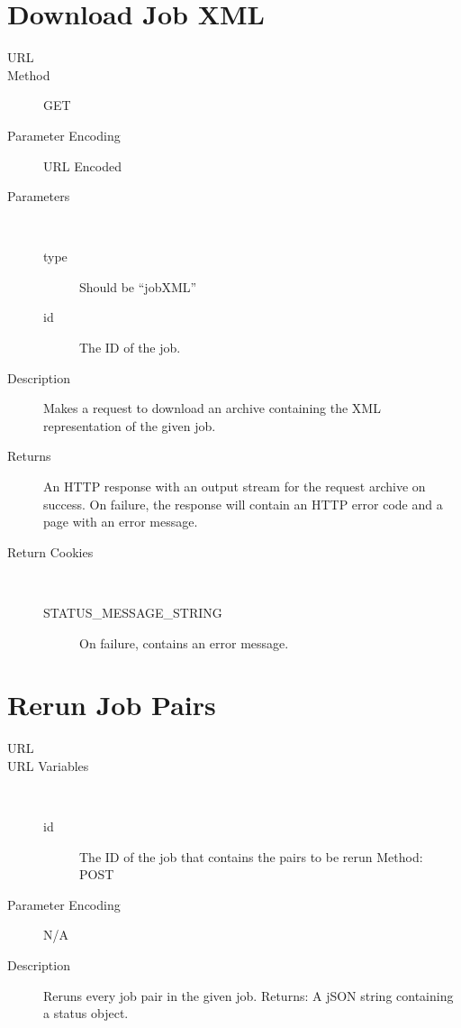 \section{Download Job XML}
\begin{description}
\item [URL] 
\item [Method] GET
\item [Parameter Encoding] URL Encoded
\item [Parameters] \
	\begin{description}
	\item [type]  Should be “jobXML”
	\item [id]  The ID of the job.
	\end{description}
\item [Description] Makes a request to download an archive containing the XML representation of the given job.
\item [Returns] An HTTP response with an output stream for the request archive on success. On failure, the response will contain an HTTP error code and a page with an error message.
\item [Return Cookies] \
	\begin{description}
	\item [STATUS\_MESSAGE\_STRING]  On failure, contains an error message.
	\end{description}
\end{description}


\section{Rerun Job Pairs}
\begin{description}
\item [URL] 
\item [URL Variables] \
	\begin{description}
	\item [id] \type{Integer} The ID of the job that contains the pairs to be rerun Method: POST
\end{description}
\item [Parameter Encoding] N/A
\item [Description] Reruns every job pair in the given job. Returns: A jSON string containing a status object.
\end{description}


